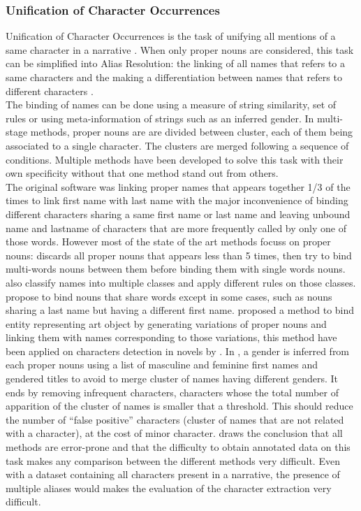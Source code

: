 \documentclass[a4paper, 12pt]{report}
\begin{document}
\subsubsection{Unification of Character Occurrences}
Unification of Character Occurrences is the task of unifying all mentions of a same character in a narrative \citep{fiction}. When only proper nouns are considered, this task can be simplified into Alias Resolution: the linking of all names that refers to a same characters and the making a differentiation between names that refers to different characters \citep{book_social}.\\
The binding of names can be done using a measure of string similarity, set of rules or using meta-information of strings such as an inferred gender. In multi-stage methods, proper nouns are are divided between cluster, each of them being associated to a single character. The clusters are merged following a sequence of conditions. Multiple methods have been developed to solve this task with their own specificity without that one method stand out from others.\\
The original software \citep{original} was linking proper names that appears together 1/3 of the times to link first name with last name with the major inconvenience of binding different characters sharing a same first name or last name and leaving unbound name and lastname of characters that are more frequently called by only one of those words. 
However most of the state of the art methods focuss on proper nouns: \cite{delete5} discards all proper nouns that appears less than 5 times, then try to bind multi-words nouns between them before binding them with single words nouns. \cite{structure_clustering} also classify names into multiple classes and apply different rules on those classes. \cite{character_meta} propose to bind nouns that share words except in some cases, such as nouns sharing a last name but having a different first name. \cite{variation} proposed a method to bind entity representing art object by generating variations of proper nouns and linking them with names corresponding to those variations, this method have been applied on characters detection in novels by \cite{quoted, character_meta}.  In \cite{delete5, structure_clustering, quoted},  a gender is inferred from each proper nouns using a list of masculine and feminine first names and gendered titles to avoid to merge cluster of names having different genders. It ends by removing infrequent characters, characters whose the total number of apparition of the cluster of names  is smaller that a threshold. This should reduce the number of ``false positive'' characters (cluster of names that are not related with a character), at the cost of minor character. \cite{delete5} draws the conclusion that all methods are error-prone and that the difficulty to obtain annotated data on this task makes any comparison between the different methods very difficult. Even with a dataset containing all characters present in a narrative, the presence of multiple aliases would makes the evaluation of the character extraction very difficult.  \\
\end{document}
